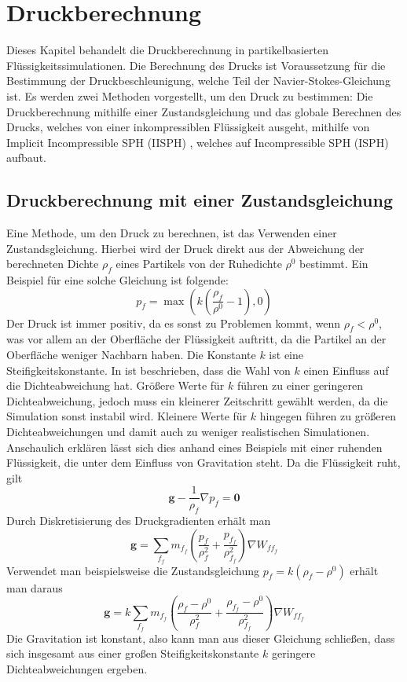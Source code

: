 \documentclass{scrreprt}
\begin{document}
\chapter{Druckberechnung}
Dieses Kapitel behandelt die Druckberechnung in partikelbasierten Flüssigkeitssimulationen.
Die Berechnung des Drucks ist Voraussetzung für die Bestimmung der Druckbeschleunigung, welche Teil der Navier-Stokes-Gleichung ist.
Es werden zwei Methoden vorgestellt, um den Druck zu bestimmen:
Die Druckberechnung mithilfe einer Zustandsgleichung und das globale Berechnen des Drucks, welches von einer inkompressiblen Flüssigkeit ausgeht,
mithilfe von Implicit Incompressible SPH (IISPH) \cite{ihmsen_implicit_2014}, 
welches auf Incompressible SPH (ISPH) \cite{shao_incompressible_2003} aufbaut.


\section{Druckberechnung mit einer Zustandsgleichung}
Eine Methode, um den Druck zu berechnen, ist das Verwenden einer Zustandsgleichung.
Hierbei wird der Druck direkt aus der Abweichung der berechneten Dichte $\rho_f$ eines Partikels von der Ruhedichte $\rho^0$ bestimmt.
Ein Beispiel für eine solche Gleichung ist folgende:
\begin{equation}
    p_f = \max \left(k \left( \frac{\rho_f}{\rho^0} - 1 \right), 0\right)
\end{equation}
Der Druck ist immer positiv, da es sonst zu Problemen kommt, wenn $\rho_f < \rho^0$, was vor allem an der Oberfläche der Flüssigkeit auftritt,
da die Partikel an der Oberfläche weniger Nachbarn haben.
Die Konstante $k$ ist eine Steifigkeitskonstante.
In \cite{koschier_smoothed_2020} ist beschrieben, dass die Wahl von $k$ einen Einfluss auf die Dichteabweichung hat.
Größere Werte für $k$ führen zu einer geringeren Dichteabweichung, jedoch muss ein kleinerer Zeitschritt gewählt werden, da die Simulation sonst instabil wird.
Kleinere Werte für $k$ hingegen führen zu größeren Dichteabweichungen und damit auch zu weniger realistischen Simulationen.
Anschaulich erklären lässt sich dies anhand eines Beispiels mit einer ruhenden Flüssigkeit, die unter dem Einfluss von Gravitation steht.
Da die Flüssigkeit ruht, gilt
\begin{equation}
    \textbf{g} - \frac{1}{\rho_f}\nabla p_f = \textbf{0}
\end{equation}
Durch Diskretisierung des Druckgradienten erhält man
\begin{equation}
    \textbf{g} = \sum_{f_f} m_{f_f} \left( \frac{p_f}{\rho_f^2} + \frac{p_{f_f}}{\rho_{f_f}^2} \right) \nabla W_{ff_f}
\end{equation}
Verwendet man beispielsweise die Zustandsgleichung $p_f = k(\rho_f - \rho^0)$ erhält man daraus
\begin{equation}
    \textbf{g} = k \sum_{f_f} m_{f_f} \left( \frac{\rho_f - \rho^0}{\rho_f^2} + \frac{\rho_{f_f} - \rho^0}{\rho_{f_f}^2} \right) \nabla W_{ff_f}
\end{equation}
Die Gravitation ist konstant,
also kann man aus dieser Gleichung schließen, dass sich insgesamt aus einer großen Steifigkeitskonstante $k$ geringere Dichteabweichungen ergeben.
\end{document}
